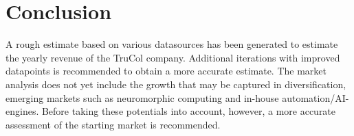 \section{Conclusion}\label{sec:conclusion}
A rough estimate based on various datasources has been generated to estimate the yearly revenue of the TruCol company. Additional iterations with improved datapoints is recommended to obtain a more accurate estimate. The market analysis does not yet include the growth that may be captured in diversification, emerging markets such as neuromorphic computing and in-house automation/AI-engines. Before taking these potentials into account, however, a more accurate assessment of the starting market is recommended.